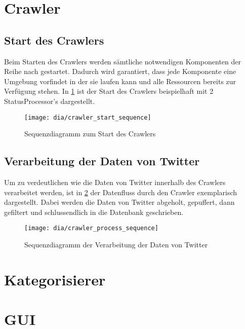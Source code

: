 \section{Crawler}

\subsection{Start des Crawlers}
Beim Starten des Crawlers werden sämtliche notwendigen Komponenten der Reihe nach gestartet. Dadurch wird garantiert, dass jede Komponente eine Umgebung vorfindet in der sie laufen kann und alle Ressourcen bereits zur Verfügung stehen. In \cref{fig:crawler_start} ist der Start des Crawlers beispielhaft mit 2 StatusProcessor's dargestellt.

\begin{figure}[htb]
\texttt{[image: dia/crawler\_start\_sequence]}
\caption{Sequenzdiagramm zum Start des Crawlers}
\label{fig:crawler_start}
\end{figure}

\subsection{Verarbeitung der Daten von Twitter}
Um zu verdeutlichen wie die Daten von Twitter innerhalb des Crawlers verarbeitet werden, ist in \cref{fig:crawler_process} der Datenfluss durch den Crawler exemplarisch dargestellt. Dabei werden die Daten von Twitter abgeholt, gepuffert, dann gefiltert und schlussendlich in die Datenbank geschrieben.

\begin{figure}[htb]
\texttt{[image: dia/crawler\_process\_sequence]}
\caption{Sequenzdiagramm der Verarbeitung der Daten von Twitter}
\label{fig:crawler_process}
\end{figure}

\section{Kategorisierer}

\section{GUI}